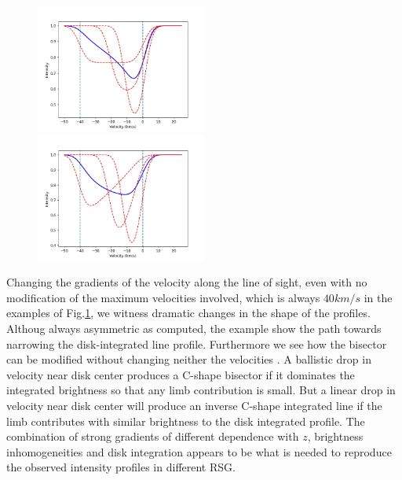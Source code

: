 \documentclass{/Users/art2/TeX/aanda/aa}
\def\kms {km\,s$^{-1}$}
\begin{document}
\begin{figure}
\includegraphics[width=0.5\textwidth]{Figure_1b.png}
\includegraphics[width=0.5\textwidth]{Figure_1c.png}
\caption{ }
\label{example}
\end{figure}

Changing the gradients of the velocity along the line of sight, even with no modification of the maximum velocities involved, which is 
always $40km/s$ in the examples of Fig.\ref{example}, we witness dramatic changes in the shape of the profiles. Althoug always asymmetric as computed, the example 
show the path towards narrowing the disk-integrated line profile. Furthermore we see how the bisector can be modified without changing neither the velocities 
. A ballistic drop in velocity near disk center produces a C-shape bisector if it dominates the integrated brightness so that any limb contribution is 
small. But a linear drop in velocity near disk center will produce an inverse C-shape integrated line if the limb contributes with similar brightness to the 
disk integrated profile. The combination of strong gradients of different dependence with $z$, brightness inhomogeneities and disk integration 
appears to be what is needed to reproduce the observed intensity profiles in different RSG.
\end{document}
